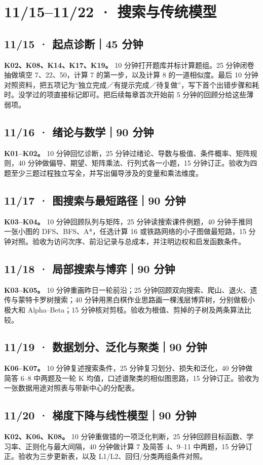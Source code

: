 \documentclass[UTF8,a4paper,11pt]{ctexart}
\begin{document}
\section{11/15–11/22 · 搜索与传统模型}
\subsection{11/15 · 起点诊断｜45 分钟}
\textbf{K02、K08、K14、K17、K19。} 10 分钟打开题库并标计算题组。25 分钟闭卷抽做填空 7、22、50，计算 7 的第一步，以及计算 8 的一道相似度。最后 10 分钟对照资料，把五项记为“独立完成／有提示完成／待复做”，写下首个出错步骤和耗时。没学过的项直接标记即可。把后续每章首次开始前 5 分钟的回顾分给这些薄弱项。

\subsection{11/16 · 绪论与数学｜90 分钟}
\textbf{K01–K02。} 10 分钟回忆诊断，25 分钟过绪论、导数与极值、条件概率、矩阵规则，40 分钟做偏导、期望、矩阵乘法、行列式各一小题，15 分钟订正。验收为四题至少三题过程独立写全，并写出偏导涉及的变量和乘法维度。

\subsection{11/17 · 图搜索与最短路径｜90 分钟}
\textbf{K03–K04。} 10 分钟回顾队列与矩阵，25 分钟读搜索课件例题，40 分钟手推同一张小图的 DFS、BFS、A*，任选计算 16 或铁路网络的小子图做最短路，15 分钟对照。验收为访问次序、前沿记录与总成本，并注明边权和启发函数条件。

\subsection{11/18 · 局部搜索与博弈｜90 分钟}
\textbf{K03–K05。} 10 分钟重画昨日一轮前沿；25 分钟回顾双向搜索、爬山、退火、遗传与蒙特卡罗树搜索；40 分钟用黑白棋作业思路画一棵浅层博弈树，分别做极小极大和 Alpha–Beta；15 分钟核对剪枝。验收为根值、剪掉的子树及两条算法比较。

\subsection{11/19 · 数据划分、泛化与聚类｜90 分钟}
\textbf{K06–K07。} 10 分钟复述搜索条件，25 分钟复习划分、损失和泛化，40 分钟做简答 6–8 中两题及一轮 K 均值，口述谱聚类的相似图思路，15 分钟订正。验收为一张数据用途对照表与带新中心的分配表。

\subsection{11/20 · 梯度下降与线性模型｜90 分钟}
\textbf{K02、K06、K08。} 10 分钟重做错的一项泛化判断，25 分钟回顾目标函数、学习率、正则化与最大间隔，40 分钟做计算 7 及简答 4、9–11 中两题，15 分钟订正。验收为三步更新表，以及 L1/L2、回归/分类两组条件对照。
\end{document}
